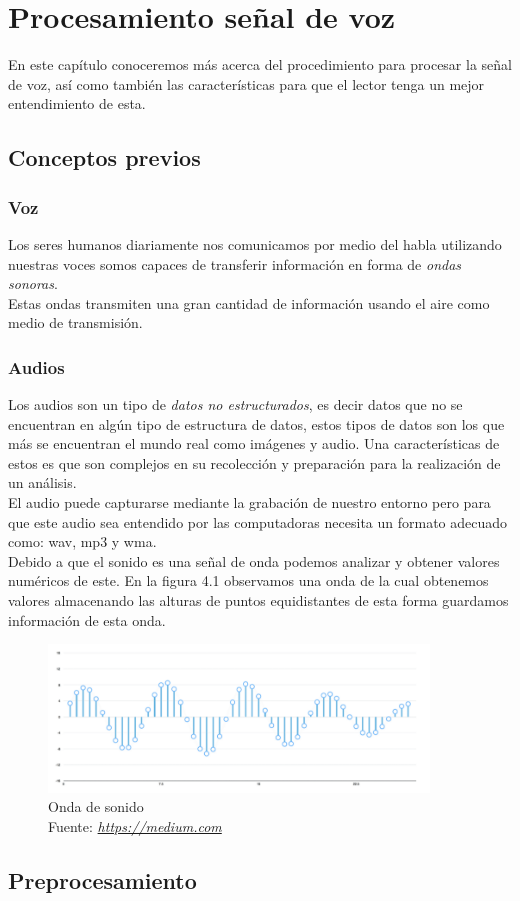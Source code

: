 \chapter{Procesamiento señal de voz}
En este capítulo conoceremos más acerca del procedimiento para procesar la señal de voz, así como también las características para que el lector tenga un mejor entendimiento de esta.

\section{Conceptos previos}
\subsection{Voz}
Los seres humanos diariamente nos comunicamos por medio del habla utilizando nuestras voces somos capaces de transferir información en forma de \textit{ondas sonoras}.\\ Estas ondas transmiten una gran cantidad de información usando el aire como medio de transmisión.
 
\subsection{Audios}
Los audios son un tipo de \textit{datos no estructurados}, es decir datos que no se encuentran en algún tipo de estructura de datos, estos tipos de datos son los que más se encuentran el mundo real como imágenes y audio. Una características de estos es que son complejos en su recolección y preparación para la realización de un análisis.\\ El audio puede capturarse mediante la grabación de nuestro entorno pero para que este audio sea entendido por las computadoras necesita un formato adecuado como: wav, mp3 y wma. \\
Debido a que el sonido es una señal de onda podemos analizar y obtener valores numéricos de este. En la figura 4.1 observamos una onda de la cual obtenemos valores almacenando las alturas de puntos equidistantes de esta forma guardamos información de esta onda.
\begin{figure}[H]
	\centering
	\includegraphics[width=0.9\textwidth]{Figures/onda.png}
	\caption{Onda de sonido \\ Fuente:  \href{https://medium.com/@venkateshpnk22/how-to-convert-your-speech-voice-to-text-data-1b2686099260}{\textit{https://medium.com}}}
	\label{onda}
\end{figure} 
\section{Preprocesamiento}